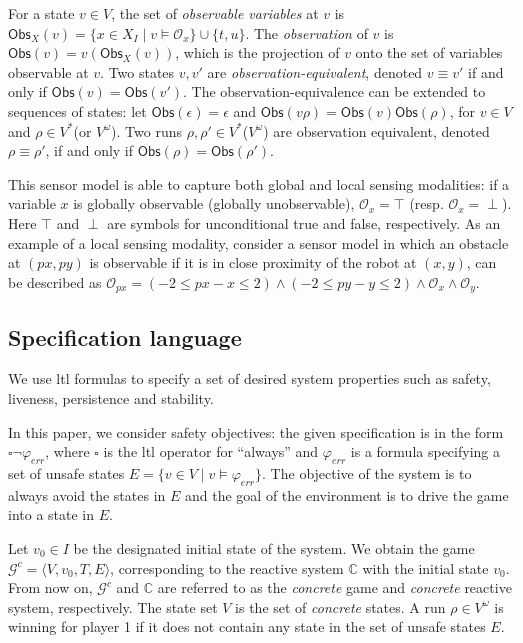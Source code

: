 \documentclass[letterpaper, 10 pt, conference]{ieeeconf}
\begin{document}
For a state $v\in V$, the set of \emph{observable variables} at $v$ is
$\mathsf{Obs}_{X}(v)=\{x\in X_I\mid v\models \mathcal{O}_x \} \cup
\{t,u\}$.  The \emph{observation} of $v$ is $\mathsf{Obs}(v)=
v(\mathsf{Obs}_X(v))$, which is the projection of $v$ onto the set of
variables observable at $v$.  Two states $v,v'$ are \emph{
  observation-equivalent}, denoted $v\equiv v'$ if and only if
$\mathsf{Obs}(v)=\mathsf{Obs}(v')$. The observation-equivalence can be
extended to sequences of states: let $\mathsf{Obs}(\epsilon) =
\epsilon$ and $\mathsf{Obs}(v
\rho)=\mathsf{Obs}(v)\mathsf{Obs}(\rho)$, for $v\in V$ and $\rho \in
V^\ast$(or $V^\omega$). Two runs $\rho,\rho' \in V^\ast$($V^\omega$) are observation equivalent, denoted $\rho\equiv \rho'$,
if and only if $\mathsf{Obs}(\rho)=\mathsf{Obs}(\rho')$.

This sensor model is able to capture both global and local sensing
modalities: if a variable $x$ is globally observable (globally
unobservable), $\mathcal{O}_x =\top $ (resp. $\mathcal{O}_x
=\perp$). Here $\top$ and $\perp$ are symbols for unconditional true
and false, respectively. As an example of a local sensing modality,
consider a sensor model in which an obstacle at $(px,py)$ is
observable if it is in close proximity of the robot at $(x,y)$, can be
described as $\mathcal{O}_{px} =(-2 \le px - x \le 2 )\land (-2 \le
py-y \le 2) \land \mathcal{O}_x\land \mathcal{O}_y$.

 


\subsection{Specification language}
We use \ac{ltl} formulas \cite{emerson1990temporal} to specify a set
of desired system properties such as safety, liveness, persistence  and
stability.  


In this paper, we consider safety objectives: the given specification
is in the form $\square \neg \varphi_{err}$, where $\square$ is the
\ac{ltl} operator for ``always'' and $\varphi_{err} $ is a formula
specifying a set of unsafe states $E=\{v \in V \mid v\models
\varphi_{err}\}.$ The objective of the system is to always avoid the
states in $E$ and the goal of the environment is to drive the game
into a state in $E$.  


Let $v_0\in I$ be the designated initial state of the system.  We
obtain the game $\mathcal{G}^c=\langle V, v_0, T,E\rangle$,
corresponding to the reactive system $\mathbb{C}$ with the initial
state $v_0$.  From now on, $\mathcal{G}^c$ and $\mathbb{C}$ are
referred to as the \emph{concrete} game and \emph{concrete} reactive
system, respectively. The state set $V$ is the set of \emph{concrete}
states.  
A run $\rho \in V^\omega$ is winning for player 1 if it does not 
contain any state in the set of unsafe states $E$.
\end{document}
